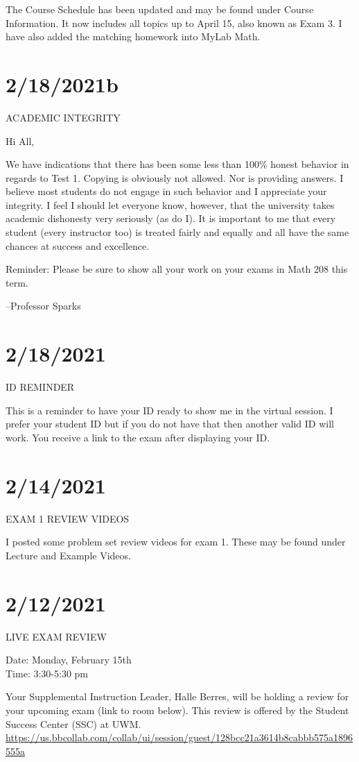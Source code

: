 \documentclass[]{article}
\begin{document}
The Course Schedule has been updated and may be found under Course Information. It now includes all topics up to April 15, also known as Exam 3. I have also added the matching homework into MyLab Math.

	
\section*{2/18/2021b}
ACADEMIC INTEGRITY

Hi All,

We have indications that there has been some less than 100\% honest behavior in regards to Test 1. Copying is obviously not allowed. Nor is providing answers. I believe most students do not engage in such behavior and I appreciate your integrity. I feel I should let everyone know, however, that the university takes academic dishonesty very seriously (as do I). It is important to me that every student (every instructor too) is treated fairly and equally and all have the same chances at success and excellence.

Reminder: Please be sure to show all your work on your exams in Math 208 this term.

--Professor Sparks
	
\section*{2/18/2021}
ID REMINDER

This is a reminder to have your ID ready to show me in the virtual session. I prefer your student ID but if you do not have that then another valid ID will work. You receive a link to the exam after  displaying your ID.
	
\section*{2/14/2021}
EXAM 1 REVIEW VIDEOS

I posted some problem set review videos for exam 1. These may be found under Lecture and Example Videos.
	
\section*{2/12/2021}
LIVE EXAM REVIEW

Date: Monday, February 15th \\
Time: 3:30-5:30 pm

Your Supplemental Instruction Leader, Halle Berres, will be holding a review for your upcoming exam (link to room below). This review is offered by the Student Success Center (SSC) at UWM. \url{https://us.bbcollab.com/collab/ui/session/guest/128bcc21a3614b8cabbb575a1896555a}
\end{document}
